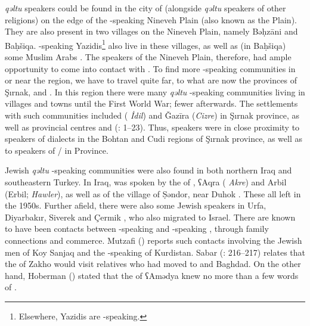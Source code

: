 \documentclass[output=paper]{langsci/langscibook}
\begin{document}
 \textit{qəltu}  speakers could be found in the city of  (alongside \textit{qəltu}  speakers of other religions) on the edge of the -speaking Nineveh Plain (also known as the  Plain). They are also present in two villages on the Nineveh Plain, namely Bəḥzāni and Baḥšiqa. -speaking Yazidis\footnote{Elsewhere, Yazidis are  -speaking.} also live in these villages, as well as (in Baḥšiqa) some Muslim Arabs \citep[24]{Jastrow1978}. The   speakers of the Nineveh Plain, therefore, had ample opportunity to come into contact with . To find more  -speaking communities in or near the  region, we have to travel quite far, to what are now the  provinces of Şırnak,  and . In this region there were many  \textit{qəltu} -speaking communities living in villages and towns until the First World War; fewer afterwards. The settlements with such communities included  ( \textit{İdil}) and Ǧazīra (\textit{Cizre}) in Şırnak province, as well as provincial centres  and  (\citealt{Jastrow1978}: 1–23). Thus,   speakers were in close proximity to speakers of  dialects in the Bohtan and Cudi regions of Şırnak province, as well as to speakers of / in  Province.

Jewish \textit{qəltu} -speaking communities were also found in both northern Iraq and southeastern Turkey. In Iraq,  was spoken by the  of , ʕAqra ( \textit{Akre}) and Arbil (Erbil;  \textit{Hawler}), as well as of the village of Ṣəndor, near Duhok \citep[9]{Hoberman1989}. These all left in the 1950s. Further afield, there were also some Jewish  speakers in Urfa, Diyarbakır, Siverek and Çermik \citep[4]{Jastrow1978}, who also migrated to Israel. There are known to have been contacts between -speaking and -speaking , through family connections and commerce. Mutzafi (\citeyear[6]{Mutzafi2004}) reports such contacts involving the Jewish men of Koy Sanjaq and the -speaking  of Kurdistan. Sabar (\citeyear{Sabar1978}: 216–217) relates that the  of Zakho would visit relatives who had moved to  and Baghdad. On the other hand, Hoberman (\citeyear[9]{Hoberman1989}) stated that the  of ʕAmədya knew no more than a few words of  .
\end{document}
